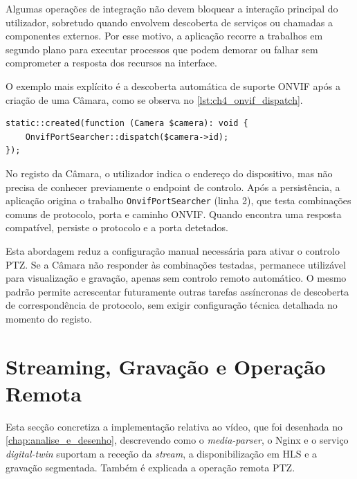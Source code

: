 Algumas operações de integração não devem bloquear a interação principal do utilizador, sobretudo quando envolvem descoberta de serviços ou chamadas a componentes externos. Por esse motivo, a aplicação recorre a trabalhos em segundo plano para executar processos que podem demorar ou falhar sem comprometer a resposta dos recursos na interface.

O exemplo mais explícito é a descoberta automática de suporte \gls{ONVIF} após a criação de uma Câmara, como se observa no \autoref{lst:ch4_onvif_dispatch}. 

\par\noindent\begin{minipage}{\linewidth}
\begin{lstlisting}[caption={Excerto simplificado de origem de tarefa após criação de uma Câmara (php)},label={lst:ch4_onvif_dispatch}]
static::created(function (Camera $camera): void {
    OnvifPortSearcher::dispatch($camera->id);
});
\end{lstlisting}
\end{minipage}

No registo da Câmara, o utilizador indica o endereço do dispositivo, mas não precisa de conhecer previamente o endpoint de controlo. Após a persistência, a aplicação origina o trabalho \texttt{OnvifPortSearcher} (linha 2), que testa combinações comuns de protocolo, porta e caminho \gls{ONVIF}. Quando encontra uma resposta compatível, persiste o protocolo e a porta detetados.

Esta abordagem reduz a configuração manual necessária para ativar o controlo \gls{PTZ}. Se a Câmara não responder às combinações testadas, permanece utilizável para visualização e gravação, apenas sem controlo remoto automático. O mesmo padrão permite acrescentar futuramente outras tarefas assíncronas de descoberta de correspondência de protocolo, sem exigir configuração técnica detalhada no momento do registo.


\section{Streaming, Gravação e Operação Remota}

Esta secção concretiza a implementação relativa ao vídeo, que foi desenhada no \autoref{chap:analise_e_desenho}, descrevendo como o \textit{media-parser}, o Nginx e o serviço \textit{digital-twin} suportam a receção da \textit{stream}, a disponibilização em \gls{HLS} e a gravação segmentada. Também é explicada a operação remota \gls{PTZ}.

